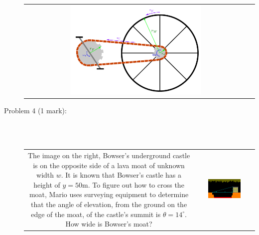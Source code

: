 \documentclass{article}
\begin{document}
\begin{description}
\begin{tabular}{cc}
{\includegraphics[width = 0.6\textwidth]{bicycle_gears}
}
\end{tabular}
\item[Problem 4 (1 mark):] ~~\\ ~~\\
\begin{tabular}{cc}
\parbox{0.4\textwidth}{
The image on the right, Bowser's underground castle is on the opposite side of a lava moat of unknown width \(w\). It is known that Bowser's castle has a height of \(y = 50\text{m}\). To figure out how to cross the moat, Mario uses surveying equipment to determine that the angle of elevation, from the ground on the edge of the moat, of the castle's summit is \(\theta = 14^\circ\). How wide is Bowser's moat?  
} & \parbox{0.6\textwidth}{
\includegraphics[width = 0.6\textwidth]{gorge_width}
}
\end{tabular}
\end{description}
\end{document}
